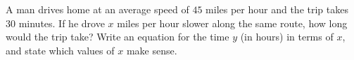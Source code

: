 A man drives home at an average speed of $45$ miles per hour and the trip takes $30$ minutes. If he drove $x$ miles per hour slower along the same route, how long would the trip take? Write an equation for the time $y$ (in hours) in terms of $x$, and state which values of $x$ make sense.
